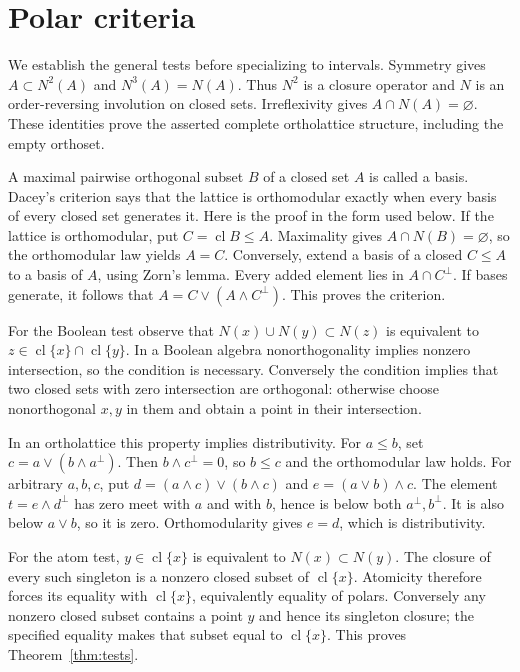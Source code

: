 \documentclass[11pt,a4paper]{article}
\theoremstyle{definition}
\newcommand{\cl}{\operatorname{cl}}
\begin{document}
\section{Polar criteria}
We establish the general tests before specializing to intervals. Symmetry gives $A\subset N^2(A)$ and $N^3(A)=N(A)$. Thus $N^2$ is a closure operator and $N$ is an order-reversing involution on closed sets. Irreflexivity gives $A\cap N(A)=\varnothing$. These identities prove the asserted complete ortholattice structure, including the empty orthoset.

A maximal pairwise orthogonal subset $B$ of a closed set $A$ is called a basis. Dacey's criterion says that the lattice is orthomodular exactly when every basis of every closed set generates it. Here is the proof in the form used below. If the lattice is orthomodular, put $C=\cl B\le A$. Maximality gives $A\cap N(B)=\varnothing$, so the orthomodular law yields $A=C$. Conversely, extend a basis of a closed $C\le A$ to a basis of $A$, using Zorn's lemma. Every added element lies in $A\cap C^\perp$. If bases generate, it follows that $A=C\vee(A\wedge C^\perp)$. This proves the criterion.

For the Boolean test observe that $N(x)\cup N(y)\subset N(z)$ is equivalent to $z\in\cl\{x\}\cap\cl\{y\}$. In a Boolean algebra nonorthogonality implies nonzero intersection, so the condition is necessary. Conversely the condition implies that two closed sets with zero intersection are orthogonal: otherwise choose nonorthogonal $x,y$ in them and obtain a point in their intersection.

In an ortholattice this property implies distributivity. For $a\le b$, set $c=a\vee(b\wedge a^\perp)$. Then $b\wedge c^\perp=0$, so $b\le c$ and the orthomodular law holds. For arbitrary $a,b,c$, put $d=(a\wedge c)\vee(b\wedge c)$ and $e=(a\vee b)\wedge c$. The element $t=e\wedge d^\perp$ has zero meet with $a$ and with $b$, hence is below both $a^\perp,b^\perp$. It is also below $a\vee b$, so it is zero. Orthomodularity gives $e=d$, which is distributivity.

For the atom test, $y\in\cl\{x\}$ is equivalent to $N(x)\subset N(y)$. The closure of every such singleton is a nonzero closed subset of $\cl\{x\}$. Atomicity therefore forces its equality with $\cl\{x\}$, equivalently equality of polars. Conversely any nonzero closed subset contains a point $y$ and hence its singleton closure; the specified equality makes that subset equal to $\cl\{x\}$. This proves Theorem~\ref{thm:tests}.
\end{document}
